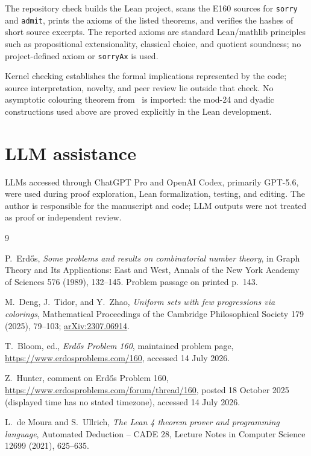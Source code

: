 \documentclass[11pt]{article}
\theoremstyle{definition}
\newcommand{\leanname}[1]{\texttt{#1}}
\begin{document}
The repository check builds the Lean project, scans the E160 sources for
\leanname{sorry} and \leanname{admit}, prints the axioms of the listed
theorems, and verifies the hashes of short source excerpts.  The reported
axioms are standard Lean/mathlib principles such as propositional
extensionality, classical choice, and quotient soundness; no project-defined
axiom or \leanname{sorryAx} is used.

Kernel checking establishes the formal implications represented by the code;
source interpretation, novelty, and peer review lie outside that check.  No
asymptotic colouring theorem from~\cite{dtz} is imported: the mod-24 and
dyadic constructions used above are proved explicitly in the Lean development.

\section{LLM assistance}

LLMs accessed through ChatGPT Pro and OpenAI Codex, primarily GPT-5.6, were
used during proof exploration, Lean formalization, testing, and editing.  The
author is responsible for the manuscript and code; LLM outputs were not
treated as proof or independent review.

\begin{thebibliography}{9}

P.~Erd\H{o}s,
\emph{Some problems and results on combinatorial number theory},
in Graph Theory and Its Applications: East and West, Annals of the New York
Academy of Sciences 576 (1989), 132--145.  Problem passage on printed
p.~143.

M.~Deng, J.~Tidor, and Y.~Zhao,
\emph{Uniform sets with few progressions via colorings},
Mathematical Proceedings of the Cambridge Philosophical Society 179 (2025),
79--103; \href{https://arxiv.org/abs/2307.06914}{arXiv:2307.06914}.

T.~Bloom, ed.,
\emph{Erd\H{o}s Problem 160}, maintained problem page,
\url{https://www.erdosproblems.com/160}, accessed 14 July 2026.

Z.~Hunter,
comment on Erd\H{o}s Problem 160,
\url{https://www.erdosproblems.com/forum/thread/160}, posted 18 October 2025
(displayed time has no stated timezone), accessed 14 July 2026.

L.~de Moura and S.~Ullrich,
\emph{The Lean 4 theorem prover and programming language},
Automated Deduction -- CADE 28, Lecture Notes in Computer Science 12699
(2021), 625--635.

\end{thebibliography}
\end{document}
